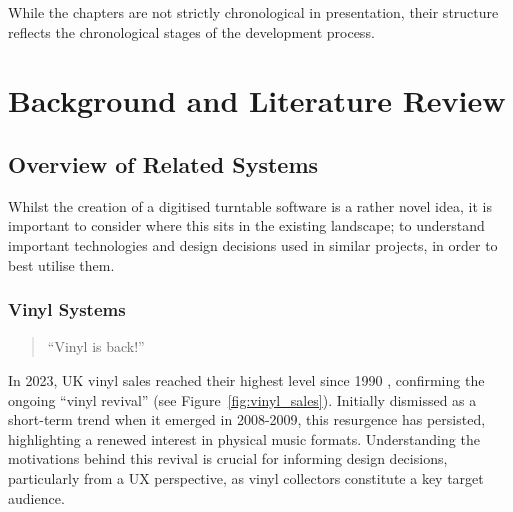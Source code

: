             While the chapters are not strictly chronological in presentation, their structure reflects the chronological stages of the development process.
    
    \section{Background and Literature Review} %
    
      \subsection{Overview of Related Systems}
    
        Whilst the creation of a digitised turntable software is a rather novel idea, it is important to consider where this sits in the existing landscape; to understand important technologies and design decisions used in similar projects, in order to best utilise them.
      
        \subsubsection{Vinyl Systems}
    
            \begin{quote}
                ``Vinyl is back!'' \cite{bechhofervttspec}
            \end{quote}
            
            In 2023, UK vinyl sales reached their highest level since 1990 \cite{geraghty2023uk_vinyl_sales}, confirming the ongoing ``vinyl revival'' \cite{vinylRevival} (see Figure~\ref{fig:vinyl_sales}). Initially dismissed as a short-term trend when it emerged in 2008-2009, this resurgence has persisted, highlighting a renewed interest in physical music formats. Understanding the motivations behind this revival is crucial for informing design decisions, particularly from a UX perspective, as vinyl collectors constitute a key target audience.
            
